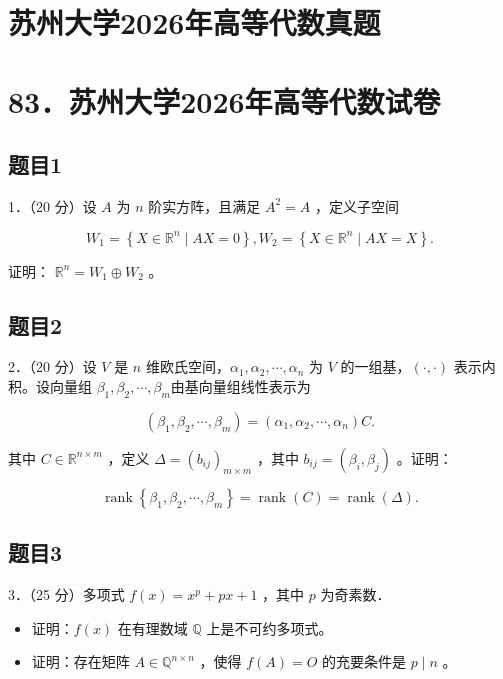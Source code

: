 \documentclass{article}
\begin{document}
\section*{苏州大学2026年高等代数真题}
\section*{83．苏州大学2026年高等代数试卷}

\subsection{题目1}
1．（20 分）设 \(A\) 为 \(n\) 阶实方阵，且满足 \(A^{2}=A\) ，定义子空间

\[
W_{1}=\left\{X \in \mathbb{R}^{n} \mid A X=0\right\}, W_{2}=\left\{X \in \mathbb{R}^{n} \mid A X=X\right\} .
\]

证明： \(\mathbb{R}^{n}=W_{1} \oplus W_{2}\) 。

\subsection{题目2}
2．（20 分）设 \(V\) 是 \(n\) 维欧氏空间，\(\alpha_{1}, \alpha_{2}, \cdots, \alpha_{n}\) 为 \(V\) 的一组基，\((\cdot, \cdot)\) 表示内积。设向量组 \(\beta_{1}, \beta_{2}, \cdots, \beta_{m}\)由基向量组线性表示为

\[
\left(\beta_{1}, \beta_{2}, \cdots, \beta_{m}\right)=\left(\alpha_{1}, \alpha_{2}, \cdots, \alpha_{n}\right) C .
\]

其中 \(C \in \mathbb{R}^{n \times m}\) ，定义 \(\Delta=\left(b_{i j}\right)_{m \times m}\) ，其中 \(b_{i j}=\left(\beta_{i}, \beta_{j}\right)\) 。证明：

\[
\operatorname{rank}\left\{\beta_{1}, \beta_{2}, \cdots, \beta_{m}\right\}=\operatorname{rank}(C)=\operatorname{rank}(\Delta) .
\]

\subsection{题目3}
3．（25 分）多项式 \(f(x)=x^{p}+p x+1\) ，其中 \(p\) 为奇素数．

\begin{itemize}
  \item[（1）] 证明：\(f(x)\) 在有理数域 \(\mathbb{Q}\) 上是不可约多项式。
  \item[（2）] 证明：存在矩阵 \(A \in \mathbb{Q}^{n \times n}\) ，使得 \(f(A)=O\) 的充要条件是 \(p \mid n\) 。
\end{itemize}
\end{document}
